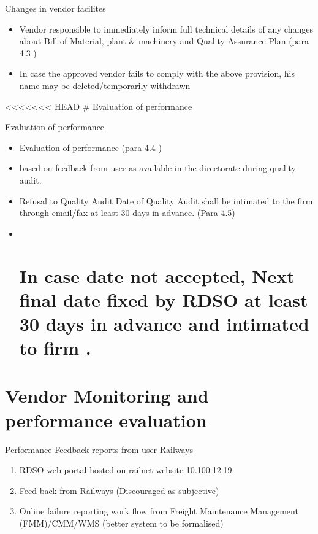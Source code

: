 \documentclass[
  10pt,
  ignorenonframetext,
  aspectratio=43,
]{beamer}
\providecommand{\tightlist}{%
  \setlength{\itemsep}{0pt}\setlength{\parskip}{0pt}}
\begin{document}
\begin{frame}{Changes in vendor facilites}
\protect\hypertarget{changes-in-vendor-facilites}{}
\begin{itemize}
\tightlist
\item
  Vendor responsible to immediately inform full technical details of any
  changes about Bill of Material, plant \& machinery and Quality
  Assurance Plan (para 4.3 )
\item
  In case the approved vendor fails to comply with the above provision,
  his name may be deleted/temporarily withdrawn
\end{itemize}

\textless\textless\textless\textless\textless\textless\textless{} HEAD
\# Evaluation of performance
\end{frame}

\begin{frame}{Evaluation of performance}
\protect\hypertarget{evaluation-of-performance}{}
\begin{itemize}
\item
  Evaluation of performance (para 4.4 )
\item
  based on feedback from user as available in the directorate during
  quality audit.
\item
  Refusal to Quality Audit Date of Quality Audit shall be intimated to
  the firm through email/fax at least 30 days in advance. (Para 4.5)
\item ~
  \hypertarget{in-case-date-not-accepted-next-final-date-fixed-by-rdso-at-least-30-days-in-advance-and-intimated-to-firm-.}{%
  \section{In case date not accepted, Next final date fixed by RDSO at
  least 30 days in advance and intimated to firm
  .}\label{in-case-date-not-accepted-next-final-date-fixed-by-rdso-at-least-30-days-in-advance-and-intimated-to-firm-.}}
\end{itemize}
\end{frame}

\hypertarget{vendor-monitoring-and-performance-evaluation}{%
\section{Vendor Monitoring and performance
evaluation}\label{vendor-monitoring-and-performance-evaluation}}

\begin{frame}{Performance Feedback reports from user Railways}
\protect\hypertarget{performance-feedback-reports-from-user-railways}{}
\begin{enumerate}
\tightlist
\item
  RDSO web portal hosted on railnet website 10.100.12.19
\item
  Feed back from Railways (Discouraged as subjective)
\item
  Online failure reporting work flow from Freight Maintenance Management
  (FMM)/CMM/WMS (better system to be formalised)
\end{enumerate}
\end{frame}
\end{document}
